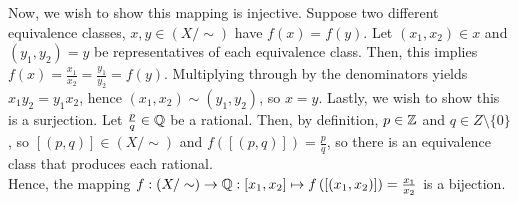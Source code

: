 \documentclass[a4paper]{article}
\begin{document}
\begin{solution}
\begin{enumerate}
		Now, we wish to show this mapping is injective. Suppose two different equivalence classes, \(x, y \in \left( X / \sim \right) \) have \(f\left( x \right) = f\left( y \right) \). Let \(\left( x_1, x_2 \right) \in x\) and \(\left( y_1, y_2 \right) = y\) be representatives of each equivalence class. Then, this implies \(f\left( x \right)  = \frac{x_1}{x_2}= \frac{y_1}{y_2} = f\left( y \right) \). Multiplying through by the denominators yields \(x_1 y_2 = y_1x_2\), hence \(\left( x_1, x_2 \right)\sim \left( y_1, y_2 \right)  \), so \(x= y\).
		Lastly, we wish to show this is a surjection. Let \(\frac{p}{q}\in \mathbb{Q}\) be a rational. Then, by definition, \(p \in \mathbb{Z}\) and \(q \in Z \setminus \{0\} \), so \(\left[ \left( p, q \right)  \right] \in \left( X / \sim \right) \) and \(f\left( \left[ \left( p, q \right)  \right]  \right) = \frac{p}{q}\), so there is an equivalence class that produces each rational.\\
		Hence, the mapping \(f:\left( X / \sim \right) \to \mathbb{Q} : \left[ x_1, x_2 \right]  \mapsto f\left( \left[ \left( x_1, x_2 \right)  \right]  \right) = \frac{x_1}{x_2}\) is a bijection.
\end{enumerate}
\end{solution}
\end{document}
